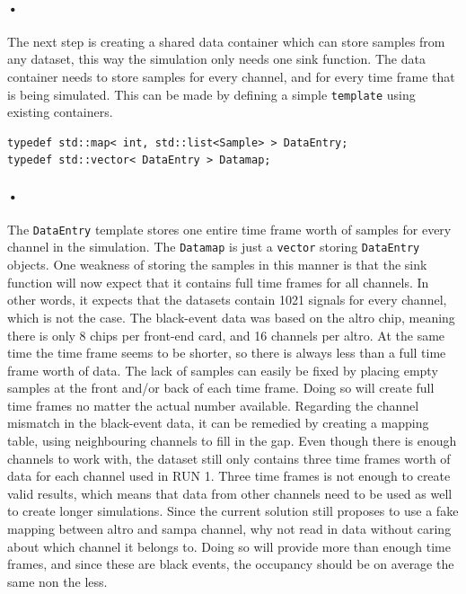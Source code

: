 \documentclass[a4paper, 12pt, openright, twoside]{report}
\newcommand{\codeword}[1]{\texttt{#1}}
\begin{document}
\paragraph{•}
The next step is creating a shared data container which can store samples from any dataset, this way the simulation only needs one sink function.
The data container needs to store samples for every channel, and for every time frame that is being simulated.
This can be made by defining a simple \codeword{template} using existing containers.

\begin{lstlisting}[caption=Data container., label=lst:data-template]
typedef std::map< int, std::list<Sample> > DataEntry;
typedef std::vector< DataEntry > Datamap;
\end{lstlisting}

\paragraph{•}
The \codeword{DataEntry} template stores one entire time frame worth of samples for every channel in the simulation.
The \codeword{Datamap} is just a \codeword{vector} storing \codeword{DataEntry} objects.
One weakness of storing the samples in this manner is that the sink function will now expect that it contains full time frames for all channels.
In other words, it expects that the datasets contain 1021 signals for every channel, which is not the case.
The black-event data was based on the \gls{altro} chip, meaning there is only 8 chips per front-end card, and 16 channels per \gls{altro}.
At the same time the time frame seems to be shorter, so there is always less than a full time frame worth of data.
The lack of samples can easily be fixed by placing empty samples at the front and/or back of each time frame.
Doing so will create full time frames no matter the actual number available.
Regarding the channel mismatch in the black-event data, it can be remedied by creating a mapping table, using neighbouring channels to fill in the gap.
Even though there is enough channels to work with, the dataset still only contains three time frames worth of data for each channel used in RUN 1.
Three time frames is not enough to create valid results, which means that data from other channels need to be used as well to create longer simulations.
Since the current solution still proposes to use a fake mapping between \gls{altro} and \gls{sampa} channel, why not read in data without caring about which channel it belongs to.
Doing so will provide more than enough time frames, and since these are black events, the occupancy should be on average the same non the less.
\end{document}
